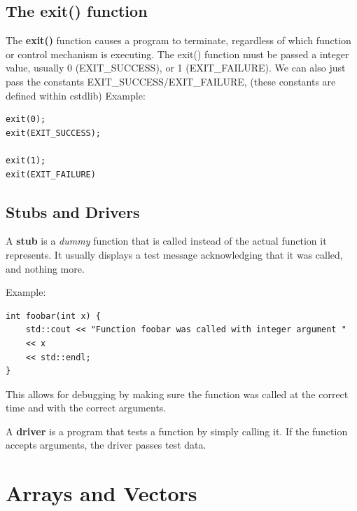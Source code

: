 \documentclass{report}
\begin{document}
    \subsection{The exit() function}
    \bigbreak \noindent 
    \begin{concept}

	\end{concept}
    \bigbreak \noindent 
    The \textbf{exit()} function causes a program to terminate, regardless of which function or control mechanism is executing.
    \bigbreak \noindent 
    \bigbreak \noindent 
    The exit() function must be passed a integer value, usually 0 (EXIT\_SUCCESS), or 1 (EXIT\_FAILURE). We can also just pass the constants EXIT\_SUCCESS/EXIT\_FAILURE, (these constants are defined within cstdlib)
    Example:
    \bigbreak \noindent 
    \sepline
    \begin{verbatim}
exit(0);
exit(EXIT_SUCCESS);

exit(1);
exit(EXIT_FAILURE)
    \end{verbatim}
    \sepline

    \pagebreak \bigbreak \noindent 
    \subsection{Stubs and Drivers}
    \bigbreak \noindent 
    \begin{concept}
 A \textbf{stub} is a \textit{dummy} function that is called instead of the actual function it represents. It usually displays a test message acknowledging that it was called, and nothing more.
	\end{concept}
    \bigbreak \noindent 
    Example:
    \bigbreak \noindent 
    \sepline
    \begin{verbatim}
int foobar(int x) {
    std::cout << "Function foobar was called with integer argument " 
    << x 
    << std::endl;
}
    \end{verbatim}
    \sepline
    \bigbreak \noindent 
    This allows for debugging by making sure the function was called at the correct time and with the correct arguments.
    \bigbreak \noindent 
    \begin{concept}
 A \textbf{driver} is a program that tests a function by simply calling it. If the function accepts arguments, the driver passes test data.
	\end{concept}

    \pagebreak \bigbreak \noindent 
    \section{\LARGE Arrays and Vectors}
    \bigbreak \noindent 
\end{document}
